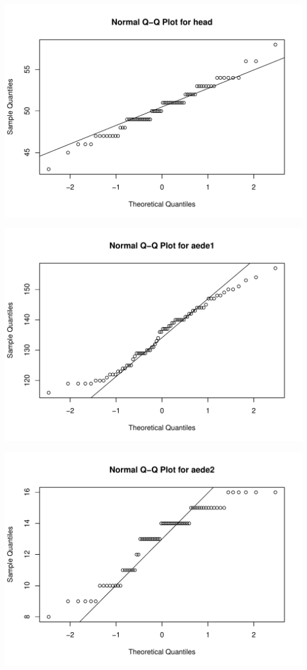 \documentclass[
]{article}
\begin{document}
\begin{center}\includegraphics[width=0.8\linewidth]{multivariate_lab_hw2_files/figure-latex/unnamed-chunk-2-3} \end{center}

\begin{center}\includegraphics[width=0.8\linewidth]{multivariate_lab_hw2_files/figure-latex/unnamed-chunk-2-4} \end{center}

\begin{center}\includegraphics[width=0.8\linewidth]{multivariate_lab_hw2_files/figure-latex/unnamed-chunk-2-5} \end{center}
\end{document}
